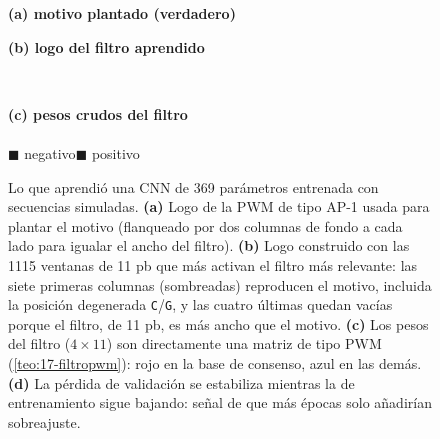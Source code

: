 \begin{figure}[!tbp]
\centering
\begin{minipage}[t]{0.49\linewidth}\centering
  {\sffamily\bfseries\scriptsize (a) motivo plantado (verdadero)}\\[2pt]
  
\end{minipage}\hfill
\begin{minipage}[t]{0.49\linewidth}\centering
  {\sffamily\bfseries\scriptsize (b) logo del filtro aprendido}\\[2pt]
  
\end{minipage}\\[8pt]
\begin{minipage}[c]{0.40\linewidth}\centering
  {\sffamily\bfseries\scriptsize (c) pesos crudos del filtro}\\[2pt]
  \\[1pt]
  {\sffamily\tiny\color{azulprofundo}$\blacksquare$ negativo\quad\color{rojo}$\blacksquare$ positivo}
\end{minipage}\hfill
\begin{minipage}[c]{0.58\linewidth}\centering
{}
\end{minipage}
\caption[Un filtro convolucional aprende un motivo]{Lo que aprendió una CNN de 369 parámetros entrenada con secuencias simuladas. \textbf{(a)} Logo de la PWM de tipo AP-1 usada para plantar el motivo (flanqueado por dos columnas de fondo a cada lado para igualar el ancho del filtro). \textbf{(b)} Logo construido con las \num{1115} ventanas de 11 pb que más activan el filtro más relevante: las siete primeras columnas (sombreadas) reproducen el motivo, incluida la posición degenerada \texttt{C}/\texttt{G}, y las cuatro últimas quedan vacías porque el filtro, de 11 pb, es más ancho que el motivo. \textbf{(c)} Los pesos del filtro ($4\times11$) son directamente una matriz de tipo PWM (\cref{teo:17-filtropwm}): rojo en la base de consenso, azul en las demás. \textbf{(d)} La pérdida de validación se estabiliza mientras la de entrenamiento sigue bajando: señal de que más épocas solo añadirían sobreajuste.}
\label{fig:17-filtro}
\end{figure}

